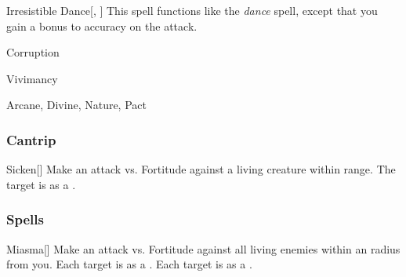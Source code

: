 \lowercase{\hypertarget{spell:Irresistible Dance}{}}\label{spell:Irresistible Dance}
\begin{apability}[\nth{6}]{\hypertarget{spell:Irresistible Dance}{Irresistible Dance}}[, ]
This spell functions like the \textit{dance} spell, except that you gain a  bonus to accuracy on the attack.
\end{apability}
\vspace{0.25em}


\newpage
\begin{spellsection}{Corruption}

\begin{spellheader}
\end{spellheader}


 Vivimancy

 Arcane, Divine, Nature, Pact

\subsubsection{Cantrip}


\begin{freeability}{Sicken}[]
Make an attack vs. Fortitude against a living creature within \rngclose range.
\hit The target is  as a .
\end{freeability}

\end{spellsection}


\subsubsection{Spells}


\lowercase{\hypertarget{spell:Miasma}{}}\label{spell:Miasma}
\begin{apability}[\nth{1}]{\hypertarget{spell:Miasma}{Miasma}}[]
Make an attack vs. Fortitude against all living enemies within an \areamed radius from you.
\hit Each target is  as a .
\crit Each target is  as a .
\end{apability}
\vspace{0.25em}



